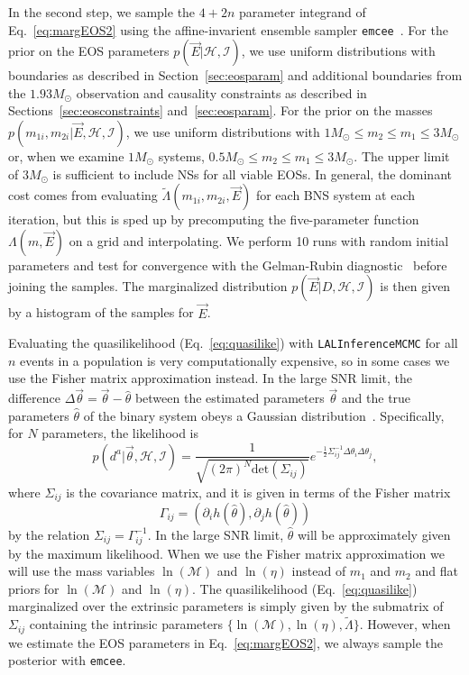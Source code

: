\documentclass[twocolumn,prd,amssymb,aps,nofootinbib,showpacs,epsf]{revtex4}
\begin{document}
In the second step, we sample the $4+2n$ parameter integrand of Eq.~\eqref{eq:margEOS2} using the affine-invarient ensemble sampler \texttt{emcee}~\cite{ForemanMackeyHogg2013}. For the prior on the EOS parameters $p(\vec E | \mathcal{H},\mathcal{I})$, we use uniform distributions with boundaries as described in Section~\ref{sec:eosparam} and additional boundaries from the $1.93M_\odot$ observation and causality constraints as described in Sections~\ref{sec:eosconstraints} and~\ref{sec:eosparam}. For the prior on the masses $p(m_{1i}, m_{2i} | \vec E, \mathcal{H},\mathcal{I})$, we use uniform distributions with $1M_\odot \le m_2 \le m_1 \le 3M_\odot$ or, when we examine $1M_\odot$ systems, $0.5M_\odot \le m_2 \le m_1 \le 3M_\odot$. The upper limit of $3M_\odot$ is sufficient to include NSs for all viable EOSs. In general, the dominant cost comes from evaluating $\tilde\Lambda(m_{1i}, m_{2i}, \vec E)$ for each BNS system at each iteration, but this is sped up by precomputing the five-parameter function $\Lambda(m, \vec E)$ on a grid and interpolating. We perform 10 runs with random initial parameters and test for convergence with the Gelman-Rubin diagnostic~\cite{GelmanRubin1992} before joining the samples. 
The marginalized distribution $p(\vec E|D, \mathcal{H}, \mathcal{I})$ is then given by a histogram of the samples for $\vec E$.

Evaluating the quasilikelihood (Eq.~\eqref{eq:quasilike}) with \texttt{LALInferenceMCMC} for all $n$ events in a population is very computationally expensive, so in some cases we use the Fisher matrix approximation instead. In the large SNR limit, the difference $\Delta\vec\theta = \vec\theta - \hat\theta$ between the estimated parameters $\vec\theta$ and the true parameters $\hat\theta$ of the binary system obeys a Gaussian distribution~\cite{FinnChernoff1993}. Specifically, for $N$ parameters, the likelihood is
\begin{equation}
\label{eq:gaussianlike}
p(d^a | \vec\theta,\mathcal{H},\mathcal{I}) = \frac{1}{\sqrt{(2\pi)^N \mathrm{det}(\Sigma_{ij})}} e^{-\frac{1}{2} \Sigma^{-1}_{ij} \Delta\theta_i \Delta\theta_j},
\end{equation}
where $\Sigma_{ij}$ is the covariance matrix, and it is given in terms of the Fisher matrix
\begin{equation}
\Gamma_{ij} = (\partial_i h(\hat\theta), \partial_j h(\hat\theta))
\end{equation}
by the relation $\Sigma_{ij}  = \Gamma^{-1}_{ij}$. In the large SNR limit, $\hat\theta$ will be approximately given by the maximum likelihood. When we use the Fisher matrix approximation we will use the mass variables $\ln(\mathcal{M})$ and $\ln(\eta)$ instead of $m_1$ and $m_2$ and flat priors for $\ln(\mathcal{M})$ and $\ln(\eta)$. The quasilikelihood (Eq.~\eqref{eq:quasilike}) marginalized over the extrinsic parameters is simply given by the submatrix of $\Sigma_{ij}$ containing the intrinsic parameters $\{\ln(\mathcal{M}), \ln(\eta), \tilde\Lambda\}$. However, when we estimate the EOS parameters in Eq.~\eqref{eq:margEOS2}, we always sample the posterior with \texttt{emcee}.
\end{document}
